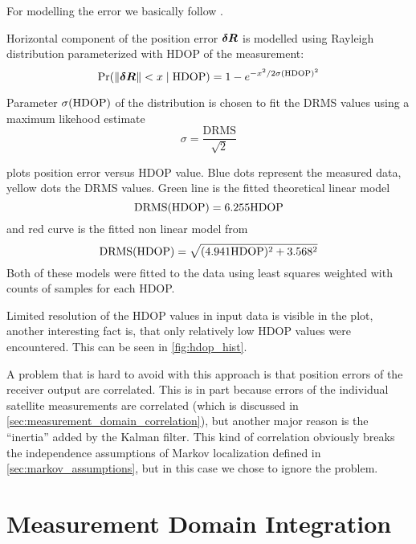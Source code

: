 For modelling the error we basically follow \cite{www-wilson}.

Horizontal component of the position error  \(\bm{\delta R}\) is modelled using Rayleigh distribution
parameterized with HDOP of the measurement:
\begin{equation}
	\operatorname{\mathrm{Pr}}(\lVert\bm{\delta R}\rVert < x \mid \mathrm{HDOP}) =
		1 - e^{-x^2/2\sigma(\mathrm{HDOP})^2}
\end{equation}

Parameter \(\sigma(\mathrm{HDOP})\) of the distribution is chosen to fit the DRMS values using a maximum likehood estimate
\begin{equation}
	\sigma = \frac{\mathrm{DRMS}}{\sqrt{2}}
\end{equation}

 plots position error versus HDOP value.
Blue dots represent the measured data, yellow dots the DRMS values.
Green line is the fitted theoretical linear model
\begin{equation}
\mathrm{DRMS}(\mathrm{HDOP}) = \num{6.255} \mathrm{HDOP}
\end{equation}
and red curve is the fitted non linear model from \cite{www-wilson}
\begin{equation}
\mathrm{DRMS}(\mathrm{HDOP}) = \sqrt{(\num{4.941}\mathrm{HDOP})^2 + \num{3.568}^2}
\end{equation}
Both of these models were fitted to the data using least squares weighted with counts of samples
for each HDOP.

Limited resolution of the HDOP values in input data is visible in the plot,
another interesting fact is, that only relatively low HDOP values were encountered.
This can be seen in \cref{fig:hdop_hist}.

A problem that is hard to avoid with this approach is that position errors of the
receiver output are correlated.
This is in part because errors of the individual satellite measurements are correlated
(which is discussed in \ref{sec:measurement_domain_correlation}), but another major reason
is the \enquote{inertia} added by the Kalman filter.
This kind of correlation obviously breaks the independence assumptions of Markov
localization defined in \ref{sec:markov_assumptions}, but in this case we chose to ignore
the problem. 

\section{Measurement Domain Integration}
\label{sec:measurement_domain}

